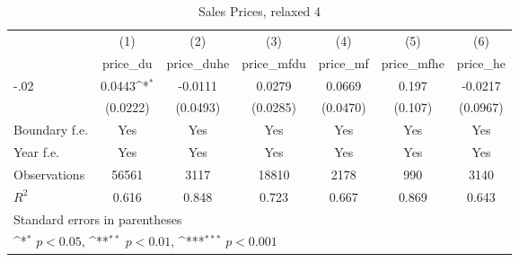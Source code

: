 \begin{table}[htbp]\centering
\def\sym#1{\ifmmode^{#1}\else\(^{#1}\)\fi}
\caption{Sales Prices, relaxed 4}
\begin{tabular}{l*{6}{c}}
\hline\hline
                    &\multicolumn{1}{c}{(1)}&\multicolumn{1}{c}{(2)}&\multicolumn{1}{c}{(3)}&\multicolumn{1}{c}{(4)}&\multicolumn{1}{c}{(5)}&\multicolumn{1}{c}{(6)}\\
                    &\multicolumn{1}{c}{price\_du}&\multicolumn{1}{c}{price\_duhe}&\multicolumn{1}{c}{price\_mfdu}&\multicolumn{1}{c}{price\_mf}&\multicolumn{1}{c}{price\_mfhe}&\multicolumn{1}{c}{price\_he}\\
\hline
-.02                &      0.0443\sym{*}  &     -0.0111         &      0.0279         &      0.0669         &       0.197         &     -0.0217         \\
                    &    (0.0222)         &    (0.0493)         &    (0.0285)         &    (0.0470)         &     (0.107)         &    (0.0967)         \\
[1em]
Boundary f.e.       &         Yes         &         Yes         &         Yes         &         Yes         &         Yes         &         Yes         \\
[1em]
Year f.e.           &         Yes         &         Yes         &         Yes         &         Yes         &         Yes         &         Yes         \\
\hline
Observations        &       56561         &        3117         &       18810         &        2178         &         990         &        3140         \\
\(R^{2}\)           &       0.616         &       0.848         &       0.723         &       0.667         &       0.869         &       0.643         \\
\hline\hline
\multicolumn{7}{l}{\footnotesize Standard errors in parentheses}\\
\multicolumn{7}{l}{\footnotesize \sym{*} \(p<0.05\), \sym{**} \(p<0.01\), \sym{***} \(p<0.001\)}\\
\end{tabular}
\end{table}
